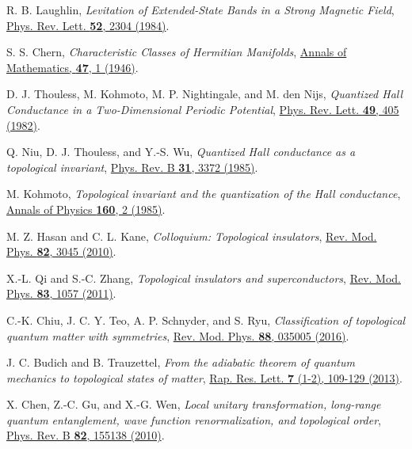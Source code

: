 \documentclass[aps,prb,amsmath,amssymb,twocolumn, superscriptaddress]{revtex4-2}
\begin{document}
\begin{thebibliography}{10}
R. B. Laughlin, {\em Levitation of Extended-State Bands in a Strong Magnetic Field}, \href{https://journals.aps.org/prl/abstract/10.1103/PhysRevLett.52.2304}{Phys. Rev. Lett. {\bfseries 52}, 2304 (1984)}.

S. S. Chern, {\em Characteristic Classes of Hermitian Manifolds}, 
\href{https://www.jstor.org/stable/1969037?seq=1}{Annals of Mathematics, {\bfseries 47}, 1 (1946)}.

D. J. Thouless, M. Kohmoto, M. P. Nightingale, and M. den Nijs, {\em Quantized Hall Conductance in a Two-Dimensional Periodic Potential}, 
\href{https://journals.aps.org/prl/abstract/10.1103/PhysRevLett.49.405}{Phys. Rev. Lett. {\bfseries{49}}, 405 (1982)}.

Q. Niu, D. J. Thouless, and Y.-S. Wu, {\em Quantized Hall conductance as a topological invariant}, 
\href{https://journals.aps.org/prb/abstract/10.1103/PhysRevB.31.3372}{Phys. Rev. B {\bfseries{31}}, 3372 (1985)}.

M. Kohmoto, {\em Topological invariant and the quantization of the Hall conductance}, \href{https://www.sciencedirect.com/science/article/pii/0003491685901484}{Annals of Physics {\bfseries 160}, 2 (1985)}.

M. Z. Hasan and C. L. Kane, {\em Colloquium: Topological insulators}, \href{https://journals.aps.org/rmp/abstract/10.1103/RevModPhys.82.3045}{Rev. Mod. Phys. {\bf{82}}, 3045 (2010)}.

X.-L. Qi and S.-C. Zhang, {\em Topological insulators and superconductors}, \href{https://journals.aps.org/rmp/abstract/10.1103/RevModPhys.83.1057}{Rev. Mod. Phys. {\bf{83}}, 1057 (2011)}.

C.-K. Chiu, J. C. Y. Teo, A. P. Schnyder, and S. Ryu, {\em Classification of topological quantum matter with symmetries}, \href{https://journals.aps.org/rmp/abstract/10.1103/RevModPhys.88.035005}{Rev. Mod. Phys. {\bf{88}}, 035005 (2016)}.

J. C. Budich and B. Trauzettel, {\em From the adiabatic theorem of quantum mechanics to topological states of matter}, \href{https://onlinelibrary.wiley.com/doi/10.1002/pssr.201206416}{Rap. Res. Lett. {\bf{7}} (1-2), 109-129 (2013)}.

X. Chen, Z.-C. Gu, and X.-G. Wen, {\em Local unitary transformation, long-range quantum entanglement, wave function renormalization, and topological order}, \href{https://journals.aps.org/prb/abstract/10.1103/PhysRevB.82.155138}{Phys. Rev. B {\bfseries 82}, 155138 (2010)}.


\end{thebibliography}
\end{document}
